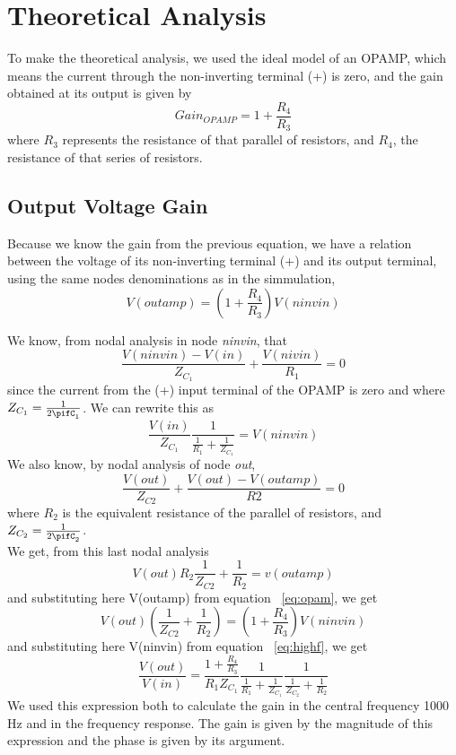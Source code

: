\section{Theoretical Analysis}
To make the theoretical analysis, we used the ideal model of an OPAMP, which means the current through the non-inverting terminal (+) is zero, and the gain obtained at its output is given by
\begin{equation}
Gain_{OPAMP}=1+\frac{R_4}{R_3}  
\end{equation}
where $R_3$ represents the resistance of that parallel of resistors, and $R_4$, the resistance of that series of resistors.
\subsection{Output Voltage Gain}
Because we know the gain from the previous equation, we have a relation between the voltage of its non-inverting terminal (+) and its output terminal, using the same nodes denominations as in the simmulation,
\begin{equation}\label{eq:opam}
  V(outamp)=(1+\frac{R_4}{R_3})V(ninvin)
\end{equation}

We know, from nodal analysis in node \textit{ninvin}, that
\begin{equation}
  \frac{V(ninvin)-V(in)}{Z_{C_1}}+\frac{V(nivin)}{R_1}=0
\end{equation}
since the current from the (+) input terminal of the OPAMP is zero and where  $Z_{C_1}=\frac{1}{2\pifC_1}$. We can rewrite this as
\begin{equation}\label{eq:highf}
  \frac{V(in)}{Z_{C_1}}\frac{1}{\frac{1}{R_1}+\frac{1}{Z_{C_1}}}=V(ninvin)
\end{equation}
We also know, by nodal analysis of node \textit{out},
\begin{equation}
  \frac{V(out)}{Z_{C2}}+\frac{V(out)-V(outamp)}{R2}=0
\end{equation}
where $R_2$ is the equivalent resistance of the parallel of resistors, and $Z_{C_2}=\frac{1}{2\pifC_2}$.\\
We get, from this last nodal analysis
\begin{equation}
  V(out)R_2\frac{1}{Z_{C2}}+\frac{1}{R_2}=v(outamp)
\end{equation}
and substituting here V(outamp) from equation ~\ref{eq:opam}, we get
\begin{equation}
  V(out)(\frac{1}{Z_{C2}}+\frac{1}{R_2})=(1+\frac{R_4}{R_3})V(ninvin)
\end{equation}
and substituting here V(ninvin) from equation ~\ref{eq:highf}, we get
\begin{equation}
  \frac{V(out)}{V(in)}=\frac{1+\frac{R_4}{R_3}}{R_1 Z_{C_1}}\frac{1}{\frac{1}{R_1}+\frac{1}{Z_{C_1}}}\frac{1}{\frac{1}{Z_{C_2}}+\frac{1}{R_2}}
\end{equation}
We used this expression both to calculate the gain in the central frequency 1000 Hz and in the frequency response. The gain is given by the magnitude of this expression and the phase is given by its argument.
